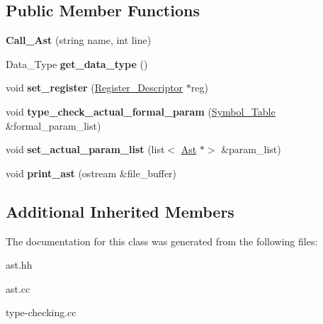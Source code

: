 \subsection*{Public Member Functions}
\begin{DoxyCompactItemize}
\item 
\mbox{\label{classCall__Ast_a9091b91b04cf1c0368baf992cef77a7a}} 
{\bfseries Call\+\_\+\+Ast} (string name, int line)
\item 
\mbox{\label{classCall__Ast_aae0b807631e876325731b460b571d122}} 
Data\+\_\+\+Type {\bfseries get\+\_\+data\+\_\+type} ()
\item 
\mbox{\label{classCall__Ast_a28cbf71b5ec6714fdd4b97e7e558acba}} 
void {\bfseries set\+\_\+register} (\hyperlink{classRegister__Descriptor}{Register\+\_\+\+Descriptor} $\ast$reg)
\item 
\mbox{\label{classCall__Ast_add4163ec6ed31925bbc50704a14d2412}} 
void {\bfseries type\+\_\+check\+\_\+actual\+\_\+formal\+\_\+param} (\hyperlink{classSymbol__Table}{Symbol\+\_\+\+Table} \&formal\+\_\+param\+\_\+list)
\item 
\mbox{\label{classCall__Ast_acc93a340af549158bf4efc5e1041984a}} 
void {\bfseries set\+\_\+actual\+\_\+param\+\_\+list} (list$<$ \hyperlink{classAst}{Ast} $\ast$$>$ \&param\+\_\+list)
\item 
\mbox{\label{classCall__Ast_ab0732164ac9b9dc8227c78eb9898b070}} 
void {\bfseries print\+\_\+ast} (ostream \&file\+\_\+buffer)
\end{DoxyCompactItemize}
\subsection*{Additional Inherited Members}


The documentation for this class was generated from the following files\+:\begin{DoxyCompactItemize}
\item 
ast.\+hh\item 
ast.\+cc\item 
type-\/checking.\+cc\end{DoxyCompactItemize}
